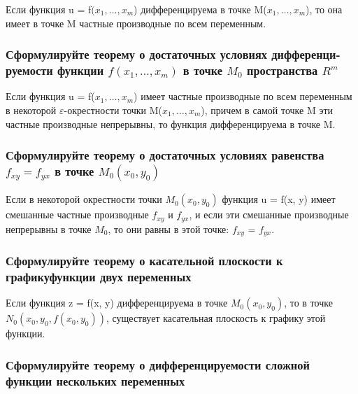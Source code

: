 \documentclass[a4paper, 12pt]{article}
\renewcommand{\epsilon}{\varepsilon}
\newcommand{\Rm}{\texorpdfstring{$R^m$}{Lg}}
\def\newline{}%
\begin{document}
            Если функция u = f$(x_1, \ldots, x_m$) дифференцируема в точке M($x_1, \ldots, x_m$),
            то она имеет в точке M частные производные по всем переменным.

            \subsubsection{Сформулируйте теорему о достаточных условиях дифференци-\newline руемости функции \texorpdfstring{$f(x_1, \ldots, x_m)$}{Lg} в точке \texorpdfstring{$M_0$}{Lg} пространства \Rm}

            Если функция u = f($x_1, \ldots, x_m$) имеет частные производные по всем
            переменным в некоторой $\epsilon$-окрестности точки M($x_1, \ldots, x_m$),
            причем в самой точке M эти частные производные непрерывны, то функция
            дифференцируема в точке M.

            \subsubsection{Сформулируйте теорему о достаточных условиях равенства\newline \texorpdfstring{$f_{xy} = f_{yx}$}{Lg} в точке \texorpdfstring{$M_0(x_0, y_0)$}{Lg}}

            Если в некоторой окрестности точки $M_0(x_0, y_0)$ функция u = f(x, y) 
            имеет смешанные частные производные $f_{xy}$ и $f_{yx}$, и если эти
            смешанные производные непрерывны в точке $M_0$, то они равны в этой точке:
            $f_{xy}$ = $f_{yx}$.

            \subsubsection{Сформулируйте теорему о касательной плоскости к графику\newline функции двух переменных}

            Если функция z = f(x, y) дифференцируема в точке $M_0(x_0, y_0)$, то в
            точке\newline $N_0(x_0, y_0, f(x_0, y_0))$, существует касательная плоскость
            к графику этой функции.

            \subsubsection{Сформулируйте теорему о дифференцируемости сложной функции нескольких переменных}
\end{document}
